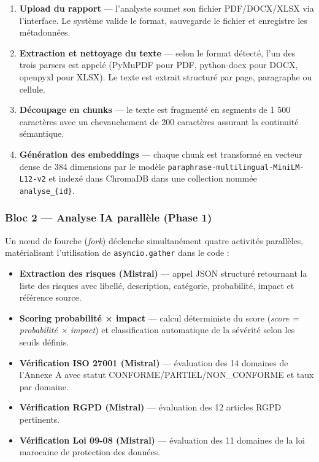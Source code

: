 \begin{enumerate}
  \item \textbf{Upload du rapport} — l'analyste soumet son fichier
    PDF/DOCX/XLSX via l'interface. Le système valide le format,
    sauvegarde le fichier et enregistre les métadonnées.
  \item \textbf{Extraction et nettoyage du texte} — selon le format
    détecté, l'un des trois parsers est appelé (PyMuPDF pour PDF,
    python-docx pour DOCX, openpyxl pour XLSX). Le texte est extrait
    structuré par page, paragraphe ou cellule.
  \item \textbf{Découpage en chunks} — le texte est fragmenté en segments
    de 1 500 caractères avec un chevauchement de 200 caractères assurant
    la continuité sémantique.
  \item \textbf{Génération des embeddings} — chaque chunk est transformé
    en vecteur dense de 384 dimensions par le modèle
    \texttt{paraphrase-multilingual-MiniLM-L12-v2} et indexé dans
    ChromaDB dans une collection nommée
    \texttt{analyse\_\{id\}}.
\end{enumerate}

\subsubsection*{Bloc 2 — Analyse IA parallèle (Phase 1)}

Un nœud de fourche (\textit{fork}) déclenche simultanément quatre
activités parallèles, matérialisant l'utilisation de
\texttt{asyncio.gather} dans le code :

\begin{itemize}
  \item \textbf{Extraction des risques (Mistral)} — appel JSON structuré
    retournant la liste des risques avec libellé, description, catégorie,
    probabilité, impact et référence source.
  \item \textbf{Scoring probabilité × impact} — calcul déterministe du
    score (\textit{score = probabilité × impact}) et classification
    automatique de la sévérité selon les seuils définis.
  \item \textbf{Vérification ISO 27001 (Mistral)} — évaluation des
    14 domaines de l'Annexe A avec statut CONFORME/PARTIEL/NON\_CONFORME
    et taux par domaine.
  \item \textbf{Vérification RGPD (Mistral)} — évaluation des 12 articles
    RGPD pertinents.
  \item \textbf{Vérification Loi 09-08 (Mistral)} — évaluation des
    11 domaines de la loi marocaine de protection des données.
\end{itemize}

